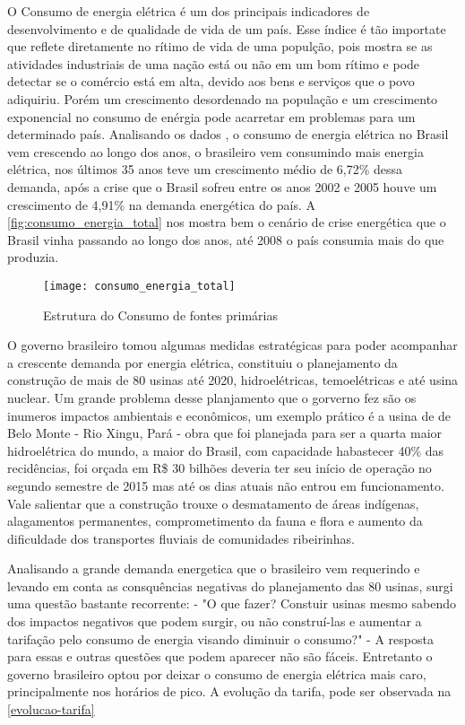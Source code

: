 O Consumo de energia elétrica é um dos principais indicadores de desenvolvimento e de qualidade de vida 
de um país. Esse índice é tão importate que reflete diretamente no rítimo de vida de uma populção, pois mostra
se as atividades industriais de uma nação está ou não em um bom rítimo e pode detectar se o comércio está em alta,
devido aos bens e serviços que o povo adiquiriu. Porém um crescimento desordenado na população e um crescimento
exponencial no consumo de enérgia pode acarretar em problemas para um determinado país.
Analisando os dados \cite{epe-balanco-final}, o consumo de energia
elétrica no Brasil vem crescendo ao longo dos anos, o brasileiro vem consumindo mais energia elétrica, nos últimos
35 anos teve um crescimento médio de 6,72\% dessa demanda, após a crise que o Brasil sofreu entre os anos 2002 e 2005 houve um crescimento
de 4,91\% na demanda energética do país. A \autoref{fig:consumo_energia_total} nos mostra bem o cenário de crise energética que o Brasil vinha
passando ao longo dos anos, até 2008 o país consumia mais do que produzia.

\begin{figure}[h!]
	\texttt{[image: consumo\_energia\_total]}
	\centering
	\caption[Estrutura do Consumo de fontes primárias]{Estrutura do Consumo de fontes primárias}
	\label{fig:consumo_energia_total}
\end{figure}
\FloatBarrier

O governo brasileiro tomou algumas medidas estratégicas para poder acompanhar a crescente demanda por energia elétrica, constituiu o planejamento
da construção de mais de 80 usinas até 2020, hidroelétricas, temoelétricas e até usina nuclear. Um grande problema desse planjamento que o gorverno
fez são os inumeros impactos ambientais e econômicos, um exemplo prático é a usina de de Belo Monte - Rio Xingu, Pará - obra que foi planejada
para ser a quarta maior hidroelétrica do mundo, a maior do Brasil, com capacidade habastecer 40\% das recidências, foi orçada em R\$ 30 bilhões
deveria ter seu início de operação no segundo semestre de 2015 mas até os dias atuais não entrou em funcionamento. Vale salientar que a construção
trouxe o desmatamento de áreas indígenas, alagamentos permanentes, comprometimento da fauna e flora e aumento da dificuldade dos transportes fluviais
de comunidades ribeirinhas.

Analisando a grande demanda energetica que o brasileiro vem requerindo e levando em conta as consquências negativas do planejamento das 80 usinas,
surgi uma questão bastante recorrente: - "O que fazer? Constuir usinas mesmo sabendo dos impactos negativos que podem surgir, ou não construí-las e
aumentar a tarifação pelo consumo de energia visando diminuir o consumo?" - A resposta para essas e outras questões que podem aparecer não são fáceis.
Entretanto o governo brasileiro optou por deixar o consumo de energia elétrica mais caro, principalmente nos horários de pico. A evolução da tarifa,
pode ser observada na \autoref{evolucao-tarifa}


